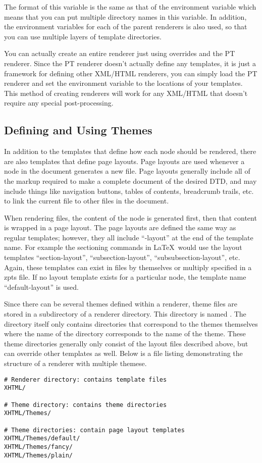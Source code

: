 The format of this variable is the same as that of the 
environment variable which means that you can put multiple directory 
names in this variable.  In addition, the environment variables for 
each of the parent renderers is also used, so that you can use
multiple layers of template directories.

You can actually create an entire renderer just using overrides and the
PT renderer.  Since the PT renderer doesn't actually define any templates,
it is just a framework for defining other XML/HTML renderers, you can
simply load the PT renderer and set the  
environment
variable to the locations of your templates.  This method of creating 
renderers will work for any XML/HTML that doesn't require any special
post-processing.


\subsection{Defining and Using Themes}

In addition to the templates that define how each node should be rendered,
there are also templates that define page layouts.  Page layouts are used
whenever a node in the document generates a new file.   Page layouts 
generally include all of the markup required to make a complete document
of the desired DTD, and may include things like navigation buttons,
tables of contents, breadcrumb trails, etc. to link the current file to
other files in the document. 

When rendering files, the content of the
node is generated first, then that content is wrapped in a page layout.
The page layouts are defined the same way as regular templates; however,
they all include ``-layout'' at the end of the template name.  For 
example the sectioning commands in \LaTeX\ would use the layout templates
``section-layout'', ``subsection-layout'', ``subsubsection-layout'', etc.
Again, these templates can exist in files by themselves or multiply 
specified in a zpts file.  If no layout template exists for a particular
node, the template name ``default-layout'' is used.

Since there can be several themes defined within a renderer, theme files
are stored in a subdirectory of a renderer directory.  This directory
is named .  The  directory itself only contains
directories that correspond to the themes themselves where the name
of the directory corresponds to the name of the theme.  These theme 
directories generally only consist of the layout files described above,
but can override other templates as well.  Below is a file listing
demonstrating the structure of a renderer with multiple themese.
\begin{verbatim}
# Renderer directory: contains template files
XHTML/

# Theme directory: contains theme directories
XHTML/Themes/

# Theme directories: contain page layout templates
XHTML/Themes/default/
XHTML/Themes/fancy/
XHTML/Themes/plain/
\end{verbatim}


